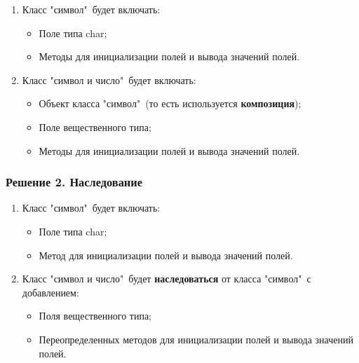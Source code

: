 \begin{enumerate}
\item Класс "символ"\ будет включать:
\begin{itemize}
    \item Поле типа char;
    \item Методы для инициализации полей и вывода значений полей.
\end{itemize}

\item Класс "символ и число"\ будет включать:
\begin{itemize}
    \item Объект класса "символ"\ (то есть используется {\bf композиция});
    \item Поле вещественного типа;
    \item Методы для инициализации полей и вывода значений полей.
\end{itemize}
\end{enumerate}

{}


\newpage
{}




\newpage\subsubsection{Решение 2. Наследование}

\begin{enumerate}
\item Класс "символ"\ будет включать:
\begin{itemize}
    \item Поле типа char;
    \item Метод для инициализации полей и вывода значений полей.
\end{itemize}

\item Класс "символ и число"\ будет {\bf наследоваться} от класса "символ"\ с добавлением:
\begin{itemize}
    \item Поля вещественного типа;
    \item Переопределенных методов для инициализации полей и вывода значений полей.
\end{itemize}
\end{enumerate}

